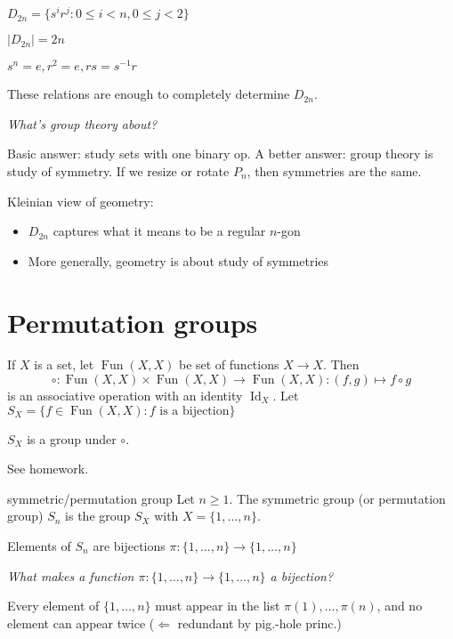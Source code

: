 \begin{exercise}
$D_{2n}=\{s^i r^j: 0\le i < n, 0\le j < 2\}$

$|D_{2n}|=2n$

$s^n=e, r^2=e,rs=s^{-1}r$

These relations are enough to completely determine $D_{2n}$.
\end{exercise}

\textit{What's group theory about?}

Basic answer: study sets with one binary op. A better answer: group theory is study of symmetry. If we resize or rotate $P_n$, then symmetries are the same.

Kleinian view of geometry:
\begin{itemize}
	\item $D_{2n}$ captures what it means to be a regular $n$-gon
	\item More generally, geometry is about study of symmetries
\end{itemize}

\section{Permutation groups}
If $X$ is a set, let $\operatorname{Fun}(X,X)$ be set of functions $X\to X$. Then
$$\circ: \operatorname{Fun}(X,X)\times \operatorname{Fun}(X,X) \to \operatorname{Fun}(X,X): (f,g)\mapsto f\circ g$$
is an associative operation with an identity $\operatorname{Id}_X$. Let $S_X = \{f\in \operatorname{Fun}(X,X): f\text{ is a bijection}\}$

\begin{prop}
$S_X$ is a group under $\circ$.
\end{prop}

\begin{pf}
See homework.
\end{pf}

\begin{defn}{symmetric/permutation group}
Let $n\ge 1$. The symmetric group (or permutation group) $S_n$ is the group $S_X$ with $X=\{1,\ldots,n\}$.
\end{defn}

Elements of $S_n$ are bijections $\pi:\{1,\ldots,n\}\to \{1,\ldots,n\}$

\textit{What makes a function $\pi:\{1,\ldots,n\}\to \{1,\ldots,n\}$ a bijection?}

Every element of $\{1,\ldots,n\}$ must appear in the list $\pi(1),\ldots,\pi(n)$, and no element can appear twice ($\Leftarrow$ redundant by pig.-hole princ.)


